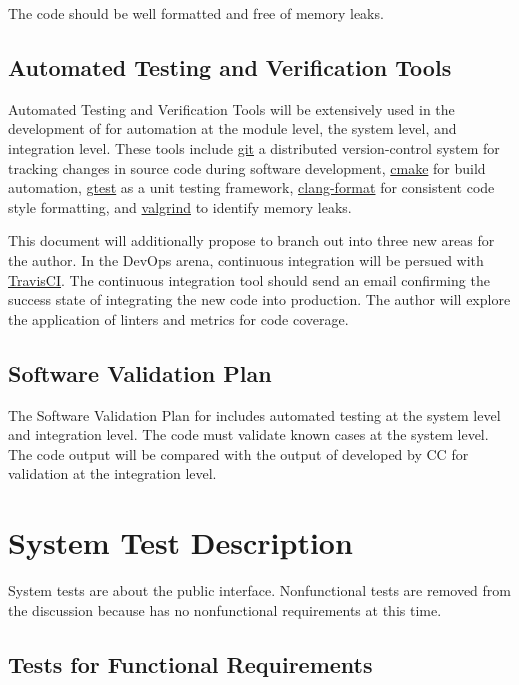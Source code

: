 \documentclass[12pt, titlepage]{article}
\begin{document}
The code should be well formatted and free of memory leaks.

\subsection{Automated Testing and Verification Tools}

Automated Testing and Verification Tools will be extensively used in the development of 
for automation at the module level, the system level, and integration level.
These tools include
\href{https://git.kernel.org/pub/scm/git/git.git}{git} a distributed version-control system
for tracking changes in source code during software development,
\href{https://cmake.org/}{cmake} for build automation,
\href{https://github.com/google/googletest}{gtest}
as a unit testing framework, \href{http://clang.llvm.org/docs/ClangFormat.html}{clang-format}
for consistent code style formatting, and \href{https://www.valgrind.org}{valgrind}
to identify memory leaks.

This document will additionally propose to branch out into three new areas for the author.
In the DevOps arena,
continuous integration will be persued with \href{https://travis-ci.org}{TravisCI}.
The continuous integration tool should send an email confirming the success state
of integrating the new code into production.
The author will explore the application of linters and metrics for code coverage.

\subsection{Software Validation Plan}

The Software Validation Plan for  includes automated testing at the system level
and integration level. The code must validate known cases at the system level. The code output
will be compared with the output of \rdcon developed by CC for validation at the integration level.

\section{System Test Description}

System tests are about the public interface. Nonfunctional tests are removed from the
discussion because  has no nonfunctional requirements at this time.
	
\subsection{Tests for Functional Requirements}
\end{document}

